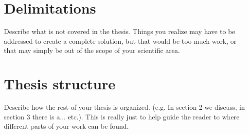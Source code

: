 \section{Delimitations}
Describe what is not covered in the thesis. Things you realize may have to be addressed to create a complete solution, but that would be too much work, or that may simply be out of the scope of your scientific area.
\section{Thesis structure}
Describe how the rest of your thesis is organized. (e.g. In section 2 we discuss, in section 3 there is a... etc.). This is really just to help guide the reader to where different parts of your work can be found.
